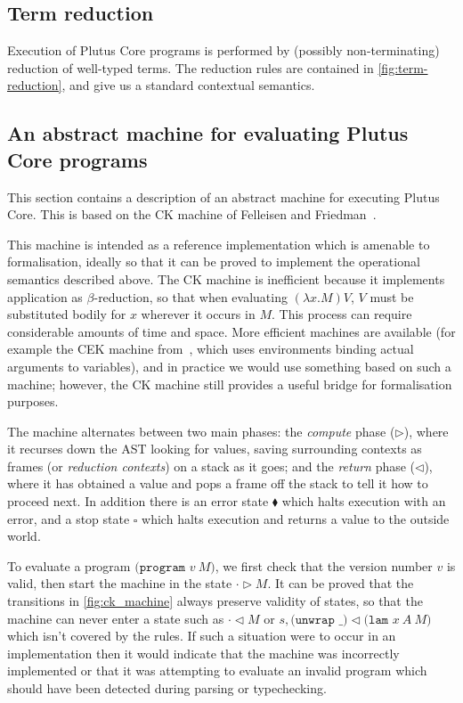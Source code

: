 \documentclass[a4paper]{article}
\begin{document}



\newpage
\subsection{Term reduction}
Execution of Plutus Core programs is performed by (possibly
non-terminating) reduction of well-typed terms.  The reduction rules
are contained in \cref{fig:term-reduction}, and give us a
standard contextual semantics.



\subsection{An abstract machine for evaluating Plutus Core programs}
This section contains a description of an abstract machine for
executing Plutus Core.  This is based on the CK machine of Felleisen
and Friedman~\citep{Felleisen-CK-CEK}.

This machine is intended as a reference implementation which is
amenable to formalisation, ideally so that it can be proved to
implement the operational semantics described above.  The CK machine
is inefficient because it implements application as $\beta$-reduction,
so that when evaluating $(\lambda x.M)V$, $V$ must be substituted
bodily for $x$ wherever it occurs in $M$.  This process can require
considerable amounts of time and space.  More efficient machines are
available (for example the CEK machine from~\citep{Felleisen-CK-CEK},
which uses environments binding actual arguments to variables), and in
practice we would use something based on such a machine; however, the
CK machine still provides a useful bridge for formalisation
purposes.



\noindent The machine alternates between two main phases: the
\emph{compute} phase ($\triangleright$), where it recurses down
the AST looking for values, saving surrounding contexts as frames (or
\emph{reduction contexts}) on a stack as it goes; and the
\emph{return} phase ($\triangleleft$), where it has obtained a value and
pops a frame off the stack to tell it how to proceed next.  In
addition there is an error state $\blacklozenge$ which halts execution
with an error, and a stop state $\square$ which halts execution and
returns a value to the outside world.

To evaluate a program $\texttt{(program } v\ M \texttt{)}$, we first
check that the version number $v$ is valid, then start the machine in
the state $\cdot \triangleright M$.  It can be proved that the
transitions in \cref{fig:ck_machine} always preserve
validity of states, so that the machine can never enter a state such as
  $\cdot \triangleleft M$
or
$s, \texttt{(unwrap \_)} \triangleleft \texttt{(lam }x\ A \ M\texttt{)}$
which isn't covered by the rules.  If such a
situation were to occur in an implementation then it would indicate
that the machine was incorrectly implemented or that it was attempting
to evaluate an invalid program which should have been detected during
parsing or typechecking.
\end{document}
